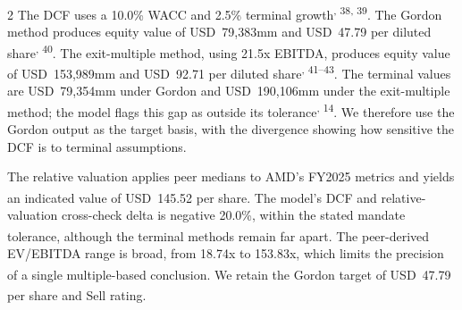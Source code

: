 \documentclass[10pt,a4paper]{article}
\renewcommand{\cite}[1]{\textsuperscript{\sffamily\color{accent}\fontsize{6.2}{6}\selectfont #1}}
\begin{document}
\begin{multicols}{2}
The DCF uses a 10.0\% WACC and 2.5\% terminal growth\cite{13, 38, 39}. The Gordon method produces equity value of USD~79,383mm and USD~47.79 per diluted share\cite{12, 40}. The exit-multiple method, using 21.5x EBITDA, produces equity value of USD~153,989mm and USD~92.71 per diluted share\cite{14, 41--43}. The terminal values are USD~79,354mm under Gordon and USD~190,106mm under the exit-multiple method; the model flags this gap as outside its tolerance\cite{13, 14}. We therefore use the Gordon output as the target basis, with the divergence showing how sensitive the DCF is to terminal assumptions.

The relative valuation applies peer medians to AMD’s FY2025 metrics and yields an indicated value of USD~145.52 per share\cite{44}. The model’s DCF and relative-valuation cross-check delta is negative 20.0\%, within the stated mandate tolerance, although the terminal methods remain far apart\cite{45}. The peer-derived EV/EBITDA range is broad, from 18.74x to 153.83x, which limits the precision of a single multiple-based conclusion\cite{44}. We retain the Gordon target of USD~47.79 per share and Sell rating\cite{12}.
\end{multicols}
\end{document}
